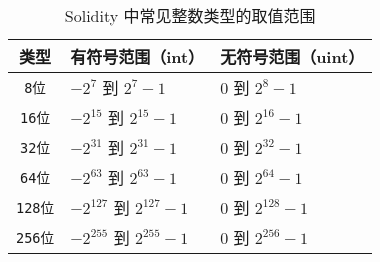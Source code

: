 \documentclass[print, master, vlined, timesmath]{DissertUESTC}
\begin{document}
\begin{table}[htbp]
    \centering
    \caption{Solidity 中常见整数类型的取值范围}
    \label{tab:solidity-integer-types}
    \begin{tabular}{|c|l|l|}
        \hline
        \textbf{类型} & \textbf{有符号范围（int）} & \textbf{无符号范围（uint）} \\
        \hline
        \texttt{8位} & $-2^7$ 到 $2^7 - 1$ & $0$ 到 $2^8 - 1$ \\
        \hline
        \texttt{16位} & $-2^{15}$ 到 $2^{15} - 1$ & $0$ 到 $2^{16} - 1$ \\
        \hline
        \texttt{32位} & $-2^{31}$ 到 $2^{31} - 1$ & $0$ 到 $2^{32} - 1$ \\
        \hline
        \texttt{64位} & $-2^{63}$ 到 $2^{63} - 1$ & $0$ 到 $2^{64} - 1$ \\
        \hline
        \texttt{128位} & $-2^{127}$ 到 $2^{127} - 1$ & $0$ 到 $2^{128} - 1$ \\
        \hline
        \texttt{256位} & $-2^{255}$ 到 $2^{255} - 1$ & $0$ 到 $2^{256} - 1$ \\
        \hline
    \end{tabular}
\end{table}

    
\end{document}

